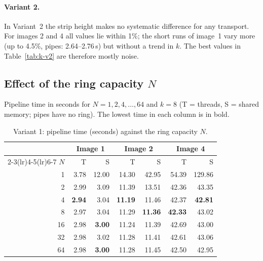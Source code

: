 \documentclass[11pt,a4paper]{article}
\newcommand{\cfgK}{8}
\begin{document}
\paragraph{Variant 2.} In Variant~2 the strip height makes no systematic difference for any
transport. For images 2 and 4 all values lie within 1\%; the short runs of image~1 vary more
(up to 4.5\%, pipes: 2.64--2.76\,s) but without a trend in $k$. The best values in
Table~\ref{tab:k-v2} are therefore mostly noise.

\subsection{Effect of the ring capacity \texorpdfstring{$N$}{N}}
Pipeline time in seconds for $N=1,2,4,\dots,64$ and $k=\cfgK$ (T = threads, S = shared memory;
pipes have no ring). The lowest time in each column is in bold.

\begin{table}[htbp]
\centering
\caption{Variant 1: pipeline time (seconds) against the ring capacity $N$.}
\label{tab:N-v1}
\begin{tabular}{r rr rr rr}
\toprule
& \multicolumn{2}{c}{Image 1} & \multicolumn{2}{c}{Image 2} & \multicolumn{2}{c}{Image 4} \\
\cmidrule(lr){2-3}\cmidrule(lr){4-5}\cmidrule(lr){6-7}
$N$ & T & S & T & S & T & S \\
\midrule
1 & 3.78 & 12.00 & 14.30 & 42.95 & 54.39 & 129.86 \\
2 & 2.99 & 3.09 & 11.39 & 13.51 & 42.36 & 43.35 \\
4 & \textbf{2.94} & 3.04 & \textbf{11.19} & 11.46 & 42.37 & \textbf{42.81} \\
8 & 2.97 & 3.04 & 11.29 & \textbf{11.36} & \textbf{42.33} & 43.02 \\
16 & 2.98 & \textbf{3.00} & 11.24 & 11.39 & 42.69 & 43.00 \\
32 & 2.98 & 3.02 & 11.28 & 11.41 & 42.61 & 43.06 \\
64 & 2.98 & \textbf{3.00} & 11.28 & 11.45 & 42.50 & 42.95 \\
\bottomrule
\end{tabular}
\end{table}
\end{document}
